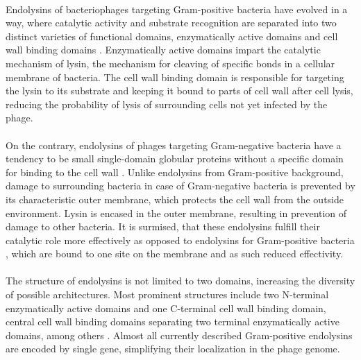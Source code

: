 \paragraph*{}
Endolysins of bacteriophages targeting Gram-positive bacteria have evolved in a way, where catalytic activity and substrate recognition are separated into two distinct varieties of functional domains, enzymatically active domains and cell wall binding domains \cite{schmelcher2012bacteriophage}. Enzymatically active domains impart the catalytic mechanism of lysin, the mechanism for cleaving of specific bonds in a cellular membrane of bacteria. The cell wall binding domain is responsible for targeting the lysin to its substrate and keeping it bound to parts of cell wall after cell lysis, reducing the probability of lysis of surrounding cells not yet infected by the phage.
\paragraph*{}
On the contrary, endolysins of phages targeting Gram-negative bacteria have a tendency to be small single-domain globular proteins without a specific domain for binding to the cell wall \cite{schmelcher2012bacteriophage}. Unlike endolysins from Gram-positive background, damage to surrounding bacteria in case of Gram-negative bacteria is prevented by its characteristic outer membrane, which protects the cell wall from the outside environment. Lysin is encased in the outer membrane, resulting in prevention of damage to other bacteria. It is surmised, that these endolysins fulfill their catalytic role more effectively as opposed to endolysins for Gram-positive bacteria \cite{schmelcher2012bacteriophage}, which are bound to one site on the membrane and as such reduced effectivity.
\paragraph*{}
The structure of endolysins is not limited to two domains, increasing the diversity of possible architectures. Most prominent structures include two N-terminal enzymatically active domains and one C-terminal cell wall binding domain, central cell wall binding domains separating two terminal enzymatically active domains, among others \cite{schmelcher2012bacteriophage}. Almost all currently described Gram-positive endolysins are encoded by single gene, simplifying their localization in the phage genome.
